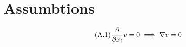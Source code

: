 \documentclass[../main.tex]{subfiles}
\begin{document}
\section{Assumbtions}

\begin{equation} \tag{A.1}
    \frac{\partial }{\partial x_i} v = 0 \implies \nabla v = 0
    \label{A:dv0}
\end{equation}
\end{document}
